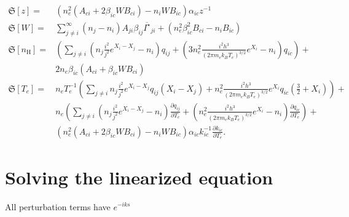 \documentclass{article}
\begin{document}
\begin{equation}
    \begin{aligned}
        \mathfrak{S}[z] = &(n_e^2(A_{ci} + 2\beta_{ic}WB_{ci}) - n_iWB_{ic})\alpha_{ic}z^{-1}\\
        \mathfrak{S}[W] = &\sum\limits_{j\neq i}^\infty (n_j-n_i)A_{ji}\beta_{ij}\overline{I^\star}_{ji} + (n_e^2\beta_{ic}^2B_{ci} - n_iB_{ic})\\
        \mathfrak{S}[n_\mathrm{H}] = & \left(\sum\limits_{j \neq i}\left(n_j\frac{i^2}{j^2}e^{X_i-X_j}-n_i\right)q_{ij}  + \left(3n_e^2\frac{i^2h^3}{(2\pi m_ek_BT_e)^{3/2}}e^{X_i}-n_i\right)q_{ic}\right) + \\
        &2n_e\beta_{ic}(A_{ci} + \beta_{ic}WB_{ci})\\
        \mathfrak{S}[T_e] = & n_eT_e^{-1}\left(\sum\limits_{j \neq i}n_j\frac{i^2}{j^2}e^{X_i-X_j}q_{ij}(X_i - X_j) + n_e^2\frac{i^2h^3}{(2\pi m_ek_BT_e)^{3/2}}e^{X_i}q_{ic}\left(\frac{3}{2} + X_i\right)\right)+\\
        & n_e\left(\sum\limits_{j \neq i}\left(n_j\frac{i^2}{j^2}e^{X_i-X_j}-n_i\right)\frac{\partial q_{ij}}{\partial T_e}  + \left(n_e^2\frac{i^2h^3}{(2\pi m_ek_BT_e)^{3/2}}e^{X_i}-n_i\right)\frac{\partial q_{ic}}{\partial T_e}\right) + \\
        & (n_e^2(A_{ci} + 2\beta_{ic}WB_{ci}) - n_iWB_{ic})\alpha_{ic}k_{ic}^{-1}\frac{\partial k_{ic}}{\partial T_e}.
    \end{aligned}
\end{equation}

\section{Solving the linearized equation}

All perturbation terms have \(e^{-iks}\)
\end{document}
